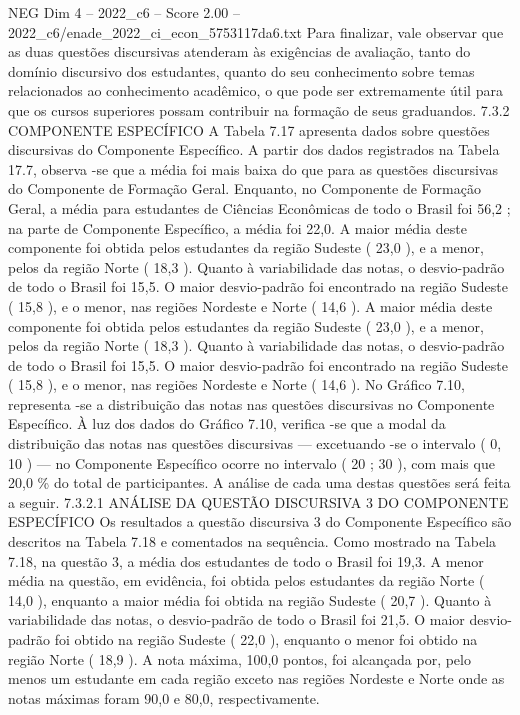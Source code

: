 \begin{textsample}{NEG Dim 4 – 2022\_c6 – Score 2.00 – 2022\_c6/enade\_2022\_ci\_econ\_5753117da6.txt}
Para finalizar, vale observar que as duas questões discursivas atenderam às exigências de avaliação, tanto do domínio discursivo dos estudantes, quanto do seu conhecimento sobre temas relacionados ao conhecimento acadêmico, o que pode ser extremamente útil para que os cursos superiores possam contribuir na formação de seus graduandos. 7.3.2 COMPONENTE ESPECÍFICO A Tabela 7.17 apresenta dados sobre questões discursivas do Componente Específico.
A partir dos dados registrados na Tabela 17.7, observa -se que a média foi mais baixa do que para as questões discursivas do Componente de Formação Geral.
Enquanto, no Componente de Formação Geral, a média para estudantes de Ciências Econômicas de todo o Brasil foi 56,2 ; na parte de Componente Específico, a média foi 22,0.
A maior média deste componente foi obtida pelos estudantes da região Sudeste ( 23,0 ), e a menor, pelos da região Norte ( 18,3 ).
Quanto à variabilidade das notas, o desvio-padrão de todo o Brasil foi 15,5.
O maior desvio-padrão foi encontrado na região Sudeste ( 15,8 ), e o menor, nas regiões Nordeste e Norte ( 14,6 ).
A maior média deste componente foi obtida pelos estudantes da região Sudeste ( 23,0 ), e a menor, pelos da região Norte ( 18,3 ).
Quanto à variabilidade das notas, o desvio-padrão de todo o Brasil foi 15,5.
O maior desvio-padrão foi encontrado na região Sudeste ( 15,8 ), e o menor, nas regiões Nordeste e Norte ( 14,6 ).
No Gráfico 7.10, representa -se a distribuição das notas nas questões discursivas no Componente Específico.
À luz dos dados do Gráfico 7.10, verifica -se que a modal da distribuição das notas nas questões discursivas — excetuando -se o intervalo ( 0, 10 ) — no Componente Específico ocorre no intervalo ( 20 ; 30 ), com mais que 20,0 \% do total de participantes.
A análise de cada uma destas questões será feita a seguir. 7.3.2.1 ANÁLISE DA QUESTÃO DISCURSIVA 3 DO COMPONENTE ESPECÍFICO Os resultados a questão discursiva 3 do Componente Específico são descritos na Tabela 7.18 e comentados na sequência.
Como mostrado na Tabela 7.18, na questão 3, a média dos estudantes de todo o Brasil foi 19,3.
A menor média na questão, em evidência, foi obtida pelos estudantes da região Norte ( 14,0 ), enquanto a maior média foi obtida na região Sudeste ( 20,7 ).
Quanto à variabilidade das notas, o desvio-padrão de todo o Brasil foi 21,5.
O maior desvio-padrão foi obtido na região Sudeste ( 22,0 ), enquanto o menor foi obtido na região Norte ( 18,9 ).
A nota máxima, 100,0 pontos, foi alcançada por, pelo menos um estudante em cada região exceto nas regiões Nordeste e Norte onde as notas máximas foram 90,0 e 80,0, respectivamente.

\end{textsample}
